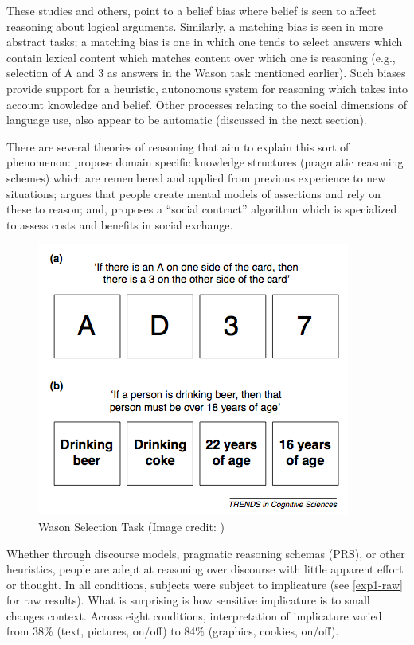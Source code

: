 These studies and others, point to a belief bias where belief is seen to affect reasoning about logical arguments. Similarly, a matching bias is seen in more abstract tasks; a matching bias is one in which one tends to select answers which contain lexical content which matches content over which one is reasoning (e.g., selection of A and 3 as answers in the Wason task mentioned earlier). Such biases provide support for a heuristic, autonomous system for reasoning which takes into account knowledge and belief. Other processes relating to the social dimensions of language use, also appear to be automatic (discussed in the next section).

There are several theories of reasoning that aim to explain this sort of phenomenon:  \citet{Cheng:1985ww}  propose domain specific knowledge structures (pragmatic reasoning schemes) which are remembered and applied from previous experience to new situations;  \citep{JohnsonLaird:1983vt}  argues that people create mental models of assertions and rely on these to reason; and,  \citep{Cosmides:1989dq}  proposes a ``social contract'' algorithm which is specialized to assess costs and benefits in social exchange.


\begin{figure}
\centerline{
  \includegraphics[scale=.75]{chapter8.tex/wason}
  }
\caption{Wason Selection Task (Image credit: \citealp{Evans:2003gp})}
\label{wason}
\end{figure}


Whether through discourse models, pragmatic reasoning schemas (PRS), or other heuristics, people are adept at reasoning over discourse with little apparent effort or thought. In all conditions, subjects were subject to implicature (see  \autoref{exp1-raw}  for raw results). What is surprising is how sensitive implicature is to small changes context. Across eight conditions, interpretation of implicature varied from 38\% (text, pictures, on\slash off) to 84\% (graphics, cookies, on\slash off). 


